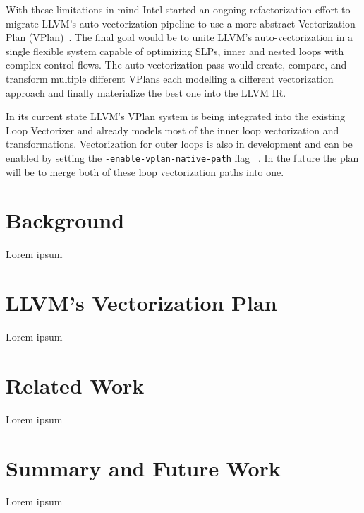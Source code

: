 \documentclass[sigplan,11pt,nonacm]{acmart}
\begin{document}
With these limitations in mind Intel started an ongoing refactorization effort to migrate LLVM's
auto-vectorization pipeline to use a more abstract Vectorization Plan 
(VPlan)~\cite{llvmextloopvec,llvmvplan}. The final goal would be to unite LLVM's auto-vectorization
in a single flexible system capable of optimizing SLPs, inner and nested loops with complex 
control flows. The auto-vectorization pass would create, compare, and transform multiple different 
VPlans each modelling a different vectorization approach and finally materialize the best one into
the LLVM IR.

In its current state LLVM's VPlan system is being integrated into the existing Loop Vectorizer and
already models most of the inner loop vectorization and transformations. Vectorization for outer 
loops is also in development and can be enabled by setting the \texttt{-enable-vplan-native-path} 
flag ~\cite{llvmouterloop}. In the future the plan will be to merge both of these loop vectorization
paths into one.




\section{Background}
\label{sec:background}
Lorem ipsum




\section{LLVM's Vectorization Plan}
\label{sec:vplan}
Lorem ipsum




\section{Related Work}
\label{sec:relatedwork}
Lorem ipsum




\section{Summary and Future Work}
\label{sec:summary}
Lorem ipsum




\end{document}
